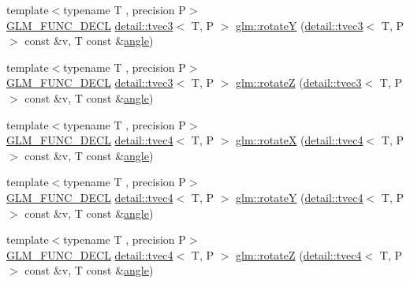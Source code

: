 \begin{DoxyCompactItemize}
\item 
{\footnotesize template$<$typename T , precision P$>$ }\\\hyperlink{setup_8hpp_ab2d052de21a70539923e9bcbf6e83a51}{G\+L\+M\+\_\+\+F\+U\+N\+C\+\_\+\+D\+E\+CL} \hyperlink{structglm_1_1detail_1_1tvec3}{detail\+::tvec3}$<$ T, P $>$ \hyperlink{group__gtx__rotate__vector_gae1e673b7a464218ce6a5e8f02145f877}{glm\+::rotateY} (\hyperlink{structglm_1_1detail_1_1tvec3}{detail\+::tvec3}$<$ T, P $>$ const \&v, T const \&\hyperlink{group__gtc__quaternion_ga23a3fc7ada5bbb665ff84c92c6e0542c}{angle})
\item 
{\footnotesize template$<$typename T , precision P$>$ }\\\hyperlink{setup_8hpp_ab2d052de21a70539923e9bcbf6e83a51}{G\+L\+M\+\_\+\+F\+U\+N\+C\+\_\+\+D\+E\+CL} \hyperlink{structglm_1_1detail_1_1tvec3}{detail\+::tvec3}$<$ T, P $>$ \hyperlink{group__gtx__rotate__vector_gae5c27548f86f1e95f76a87cf16f512da}{glm\+::rotateZ} (\hyperlink{structglm_1_1detail_1_1tvec3}{detail\+::tvec3}$<$ T, P $>$ const \&v, T const \&\hyperlink{group__gtc__quaternion_ga23a3fc7ada5bbb665ff84c92c6e0542c}{angle})
\item 
{\footnotesize template$<$typename T , precision P$>$ }\\\hyperlink{setup_8hpp_ab2d052de21a70539923e9bcbf6e83a51}{G\+L\+M\+\_\+\+F\+U\+N\+C\+\_\+\+D\+E\+CL} \hyperlink{structglm_1_1detail_1_1tvec4}{detail\+::tvec4}$<$ T, P $>$ \hyperlink{group__gtx__rotate__vector_gaa0db2d8b73f86d7bfdf2bface4056e88}{glm\+::rotateX} (\hyperlink{structglm_1_1detail_1_1tvec4}{detail\+::tvec4}$<$ T, P $>$ const \&v, T const \&\hyperlink{group__gtc__quaternion_ga23a3fc7ada5bbb665ff84c92c6e0542c}{angle})
\item 
{\footnotesize template$<$typename T , precision P$>$ }\\\hyperlink{setup_8hpp_ab2d052de21a70539923e9bcbf6e83a51}{G\+L\+M\+\_\+\+F\+U\+N\+C\+\_\+\+D\+E\+CL} \hyperlink{structglm_1_1detail_1_1tvec4}{detail\+::tvec4}$<$ T, P $>$ \hyperlink{group__gtx__rotate__vector_gae48a26ac0e3670ad2486858bf2a8e90b}{glm\+::rotateY} (\hyperlink{structglm_1_1detail_1_1tvec4}{detail\+::tvec4}$<$ T, P $>$ const \&v, T const \&\hyperlink{group__gtc__quaternion_ga23a3fc7ada5bbb665ff84c92c6e0542c}{angle})
\item 
{\footnotesize template$<$typename T , precision P$>$ }\\\hyperlink{setup_8hpp_ab2d052de21a70539923e9bcbf6e83a51}{G\+L\+M\+\_\+\+F\+U\+N\+C\+\_\+\+D\+E\+CL} \hyperlink{structglm_1_1detail_1_1tvec4}{detail\+::tvec4}$<$ T, P $>$ \hyperlink{group__gtx__rotate__vector_ga1db5137be16ed5d375038e06707ac52b}{glm\+::rotateZ} (\hyperlink{structglm_1_1detail_1_1tvec4}{detail\+::tvec4}$<$ T, P $>$ const \&v, T const \&\hyperlink{group__gtc__quaternion_ga23a3fc7ada5bbb665ff84c92c6e0542c}{angle})

\end{DoxyCompactItemize}
